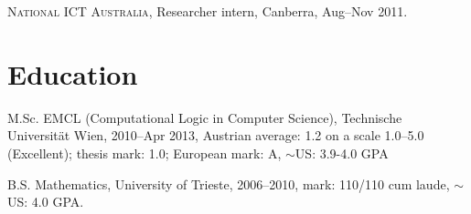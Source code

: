 \documentclass[letterpaper]{article}
\renewenvironment{itemize}{
  \begin{list}{}{
    \setlength{\leftmargin}{1.5em}
  }
}{
  \end{list}
}
\newenvironment{no-indent-itemize}{
  \begin{list}{}{
    \setlength{\leftmargin}{0em}
  }
}{
  \end{list}
}
\def\tilde{$\scriptstyle\sim$}
\def\bullet{$\circ$\xspace}
\begin{document}
\begin{no-indent-itemize}
  \item \textsc{National ICT Australia}, Researcher intern, Canberra, Aug--Nov 2011. 
\end{no-indent-itemize}

\section*{Education}
\begin{no-indent-itemize}
  \item M.Sc. EMCL (Computational Logic in Computer Science), Technische Universit\"{a}t Wien, 2010--Apr 2013,
       Austrian average: 1.2 on a scale 1.0--5.0 (Excellent); thesis mark: 1.0; European mark: A, \tilde US: 3.9-4.0 GPA
  \item B.S. Mathematics, University of Trieste, 2006--2010, mark: 110/110 cum laude, \tilde US: 4.0 GPA.
\end{no-indent-itemize}
\end{document}
